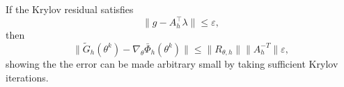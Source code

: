 If the Krylov residual satisfies
\begin{equation}
\|g - A_h^\top \lambda\| \le \varepsilon,
\end{equation}
then
\begin{equation}
\|\tilde G_h(\theta^k)-\nabla_\theta \bar\Phi_h(\theta^k)\|
\le
\|R_{\theta,h}\| \|A_h^{-T}\| \varepsilon,
\end{equation}
showing the the error can be made arbitrary small by taking sufficient Krylov iterations.